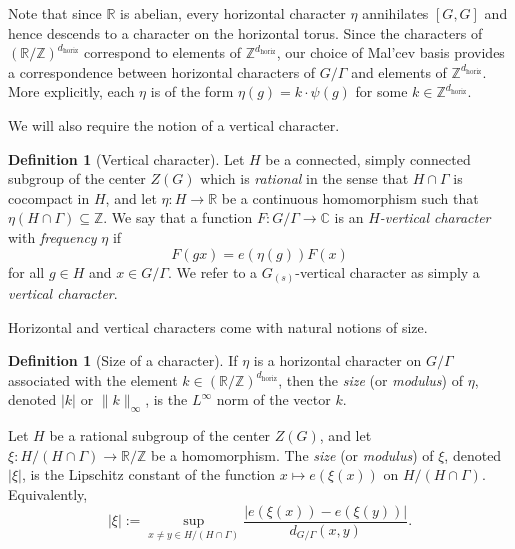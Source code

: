 \documentclass[11pt]{amsart}
\theoremstyle{definition}
\newtheorem{definition}[lemma]{Definition}
\newcommand{\C}{{\mathbb C}}
\newcommand{\R}{{\mathbb R}}
\newcommand{\Z}{{\mathbb Z}}
\begin{document}
Note that since $\mathbb{R}$ is abelian, every horizontal character $\eta$ annihilates $[G, G]$ and hence descends to a character on the horizontal torus.  Since the characters of $(\R/\Z)^{d_{\mathrm{horiz}}}$ correspond to elements of $\Z^{d_{\mathrm{horiz}}}$, our choice of Mal'cev basis provides a correspondence between horizontal characters of $G/\Gamma$ and elements of $\Z^{d_{\mathrm{horiz}}}$.  More explicitly, each $\eta$ is of the form $\eta(g) = k \cdot \psi(g)$ for some $k \in \Z^{d_{\mathrm{horiz}}}$.


We will also require the notion of a vertical character.
\begin{definition}[Vertical character]
Let $H$ be a connected, simply connected subgroup of the center $Z(G)$ which is \emph{rational} in the sense that $H \cap \Gamma$ is cocompact in $H$, and let $\eta: H \to \R$ be a continuous homomorphism such that $\eta(H \cap \Gamma) \subseteq \Z$.  We say that a function $F: G/\Gamma \to \C$ is an \emph{$H$-vertical character} with \emph{frequency} $\eta$ if
$$F(gx)=e(\eta(g))F(x)$$
for all $g \in H$ and $x \in G/\Gamma$. We refer to a $G_{(s)}$-vertical character as simply a \emph{vertical character}.
\end{definition}



Horizontal and vertical characters come with natural notions of size.
\begin{definition}[Size of a character]
If $\eta$ is a horizontal character on $G/\Gamma$ associated with the element $k \in (\R/\Z)^{d_{\mathrm{horiz}}}$, then the \emph{size} (or \emph{modulus}) of $\eta$, denoted $|k|$ or $\|k\|_\infty$, is the $L^\infty$ norm of the vector $k$. 

Let $H$ be a rational subgroup of the center $Z(G)$, and let $\xi\colon H/(H\cap\Gamma) \to \mathbb{R}/\mathbb{Z}$ be a homomorphism.  The \emph{size} (or \emph{modulus}) of $\xi$, denoted $|\xi|$, is the Lipschitz constant of the function $x \mapsto e(\xi(x))$ on $H/(H\cap\Gamma)$. Equivalently,
$$|\xi| := \sup_{x \neq y \in H/(H\cap\Gamma)} \frac{|e(\xi(x)) - e(\xi(y))|}{d_{G/\Gamma}(x, y)}.$$ 
\end{definition}
\end{document}
